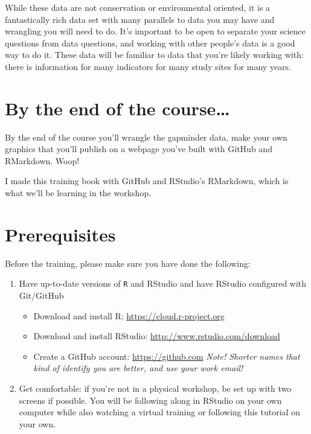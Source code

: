 \documentclass[]{book}
\providecommand{\tightlist}{%
  \setlength{\itemsep}{0pt}\setlength{\parskip}{0pt}}
\theoremstyle{definition}
\theoremstyle{definition}
\theoremstyle{definition}
\theoremstyle{remark}
\begin{document}
While these data are not conservation or environmental oriented, it is a
fantastically rich data set with many parallels to data you may have and
wrangling you will need to do. It's important to be open to separate
your science questions from data questions, and working with other
people's data is a good way to do it. These data will be familiar to
data that you're likely working with: there is information for many
indicators for many study sites for many years.

\section{By the end of the
course\ldots{}}\label{by-the-end-of-the-course}

By the end of the course you'll wrangle the gapminder data, make your
own graphics that you'll publish on a webpage you've built with GitHub
and RMarkdown. Woop!

I made this training book with GitHub and RStudio's RMarkdown, which is
what we'll be learning in the workshop.

\section{Prerequisites}\label{prerequisites}

Before the training, please make sure you have done the following:

\begin{enumerate}
\def\labelenumi{\arabic{enumi}.}
\tightlist
\item
  Have up-to-date versions of \texttt{R} and RStudio and have RStudio
  configured with Git/GitHub

  \begin{itemize}
  \tightlist
  \item
    Download and install R: \url{https://cloud.r-project.org}
  \item
    Download and install RStudio: \url{http://www.rstudio.com/download}
  \item
    Create a GitHub account: \url{https://github.com} \emph{Note!
    Shorter names that kind of identify you are better, and use your
    work email!}
  \end{itemize}
\item
  Get comfortable: if you're not in a physical workshop, be set up with
  two screens if possible. You will be following along in RStudio on
  your own computer while also watching a virtual training or following
  this tutorial on your own.
\end{enumerate}
\end{document}
